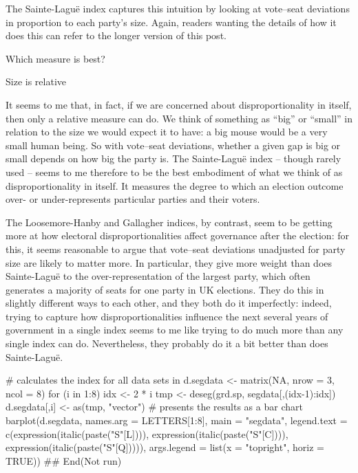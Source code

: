 The Sainte-Laguë index captures this intuition by looking at vote–seat deviations in proportion to each party’s size. Again, readers wanting the details of how it does this can refer to the longer version of this post.

Which measure is best?


Size is relative

It seems to me that, in fact, if we are concerned about disproportionality in itself, then only a relative measure can do. We think of something as “big” or “small” in relation to the size we would expect it to have: a big mouse would be a very small human being. So with vote–seat deviations, whether a given gap is big or small depends on how big the party is. The Sainte-Laguë index – though rarely used – seems to me therefore to be the best embodiment of what we think of as disproportionality in itself. It measures the degree to which an election outcome over- or under-represents particular parties and their voters.

The Loosemore-Hanby and Gallagher indices, by contrast, seem to be getting more at how electoral disproportionalities affect governance after the election: for this, it seems reasonable to argue that vote–seat deviations unadjusted for party size are likely to matter more. In particular, they give more weight than does Sainte-Laguë to the over-representation of the largest party, which often generates a majority of seats for one party in UK elections. They do this in slightly different ways to each other, and they both do it imperfectly: indeed, trying to capture how disproportionalities influence the next several years of government in a single index seems to me like trying to do much more than any single index can do. Nevertheless, they probably do it a bit better than does Sainte-Laguë.




# calculates the index for all data sets in
  d.segdata <- matrix(NA, nrow = 3, ncol = 8)
  for (i in 1:8) {
    idx <- 2 * i
    tmp <- deseg(grd.sp, segdata[,(idx-1):idx])
    d.segdata[,i] <- as(tmp, "vector")
}
  # presents the results as a bar chart
  barplot(d.segdata, names.arg = LETTERS[1:8], main = "segdata",
          legend.text = c(expression(italic(paste("S"[L]))),
                          expression(italic(paste("S"[C]))),
                          expression(italic(paste("S"[Q])))),
          args.legend = list(x = "topright", horiz = TRUE))
  ## End(Not run)
